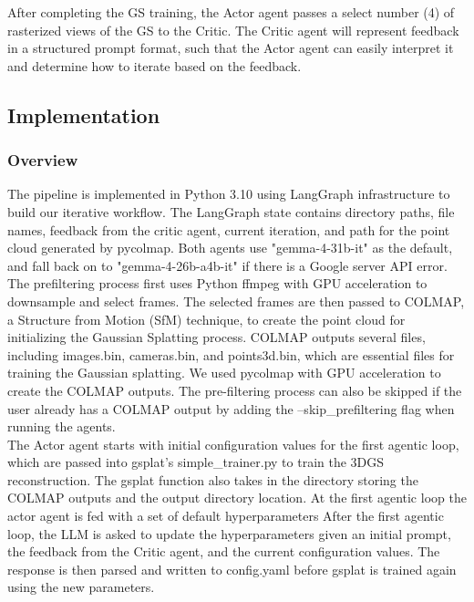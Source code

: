 \noindent After completing the GS training, the Actor agent passes a select number (4) of rasterized views of the GS to the Critic. The Critic agent will represent feedback in a structured prompt format, such that the Actor agent can easily interpret it and determine how to iterate based on the feedback.

\subsection{Implementation}

\subsubsection{Overview}
\noindent The pipeline is implemented in Python 3.10 using LangGraph infrastructure to build our iterative workflow. The LangGraph state contains directory paths, file names, feedback from the critic agent, current iteration, and path for the point cloud generated by pycolmap. Both agents use "gemma-4-31b-it" as the default, and fall back on to "gemma-4-26b-a4b-it" if there is a Google server API error.\\

\noindent The prefiltering process first uses Python ffmpeg with GPU acceleration to downsample and select frames. The selected frames are then passed to COLMAP, a Structure from Motion (SfM) technique, to create the point cloud for initializing the Gaussian Splatting process. COLMAP outputs several files, including images.bin, cameras.bin, and points3d.bin, which are essential files for training the Gaussian splatting. We used pycolmap with GPU acceleration to create the COLMAP outputs. The pre-filtering process can also be skipped if the user already has a COLMAP output by adding the –skip\_prefiltering flag when running the agents.\\

\noindent The Actor agent starts with initial configuration values for the first agentic loop, which are passed into gsplat’s simple\_trainer.py to train the 3DGS reconstruction. The gsplat function also takes in the directory storing the COLMAP outputs and the output directory location. At the first agentic loop the actor agent is fed with a set of default hyperparameters After the first agentic loop, the LLM is asked to update the hyperparameters given an initial prompt, the feedback from the Critic agent, and the current configuration values. The response is then parsed and written to config.yaml before gsplat is trained again using the new parameters.\\


